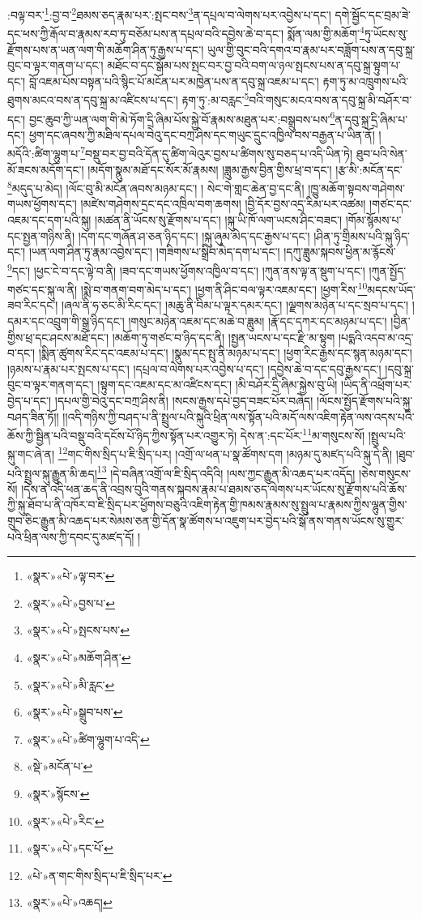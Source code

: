 :བལྟ་བར་\footnote{«སྣར་»«པེ་»ལྟ་བར་}:བྱ་བ་\footnote{«སྣར་»«པེ་»བྱས་པ་}ཐམས་ཅད་རྣམ་པར་:སྤང་བས་\footnote{«སྣར་»«པེ་»སྤངས་པས་}ན་དཔྲལ་བ་ལེགས་པར་འབྱེས་པ་དང་། དགེ་སྦྱོང་དང་བྲམ་ཟེ་དང་ཕས་ཀྱི་རྒོལ་བ་རྣམས་རབ་ཏུ་བཅོམ་པས་ན་དཔྲལ་བའི་དབྱེས་ཆེ་བ་དང་། སྨོན་ལམ་གྱི་མཆོག་\footnote{«སྣར་»«པེ་»མཆོག་ཤིན་}ཏུ་ཡོངས་སུ་རྫོགས་པས་ན་ཡན་ལག་གི་མཆོག་ཤིན་ཏུ་རྒྱས་པ་དང་། ཡུལ་གྱི་བུང་བའི་དགའ་བ་རྣམ་པར་བཟློག་པས་ན་དབུ་སྐྲ་བུང་བ་ལྟར་གནག་པ་དང་། མཐོང་བ་དང་སྒོམ་པས་སྤང་བར་བྱ་བའི་བག་ལ་ཉལ་སྤངས་པས་ན་དབུ་སྐྲ་སྟུག་པ་དང་། བློ་འཇམ་པོས་བསྟན་པའི་སྙིང་པོ་མངོན་པར་མཁྱེན་པས་ན་དབུ་སྐྲ་འཇམ་པ་དང་། རྟག་ཏུ་མ་འཁྲུགས་པའི་ཐུགས་མངའ་བས་ན་དབུ་སྐྲ་མ་འཛིངས་པ་དང་། རྟག་ཏུ་:མ་བརླང་\footnote{«སྣར་»«པེ་»མི་རླང་}བའི་གསུང་མངའ་བས་ན་དབུ་སྐྲ་མི་བཤོར་བ་དང་། བྱང་ཆུབ་ཀྱི་ཡན་ལག་གི་མེ་ཏོག་དྲི་ཞིམ་པོས་སྐྱེ་བོ་རྣམས་མཐུན་པར་:བསྒྲུབས་པས་\footnote{«སྣར་»«པེ་»སྒྲུབ་པས་}ན་དབུ་སྐྲ་དྲི་ཞིམ་པ་དང་། ཕྱག་དང་ཞབས་ཀྱི་མཐིལ་དཔལ་བེའུ་དང་བཀྲ་ཤིས་དང་གཡུང་དྲུང་འཁྱིལ་བས་བརྒྱན་པ་ཡིན་ནོ། །མདོའི་:ཚིག་ལྷུག་པ་\footnote{«སྣར་»«པེ་»ཚིག་ལྷུག་པ་འདི་}བསྡུ་བར་བྱ་བའི་དོན་དུ་ཚིག་ལེའུར་བྱས་པ་ཚིགས་སུ་བཅད་པ་འདི་ཡིན་ཏེ། ཐུབ་པའི་སེན་མོ་ཟངས་མདོག་དང་། །མདོག་སྣུམ་མཐོ་དང་སོར་མོ་རྣམས། །ཟླུམ་རྒྱས་བྱིན་གྱིས་ཕྲ་བ་དང་། །རྩ་མི་:མངོན་དང་\footnote{«སྡེ་»མངོན་པ་}མདུད་པ་མེད། །ལོང་བུ་མི་མངོན་ཞབས་མཉམ་དང་། །
སེང་གེ་གླང་ཆེན་བྱ་དང་ནི། །ཁྱུ་མཆོག་སྟབས་གཤེགས་གཡས་ཕྱོགས་དང་། །མཛེས་གཤེགས་དྲང་དང་འཁྲིལ་བག་ཆགས། །བྱི་དོར་བྱས་འདྲ་རིམ་པར་འཚམ། །གཙང་དང་འཇམ་དང་དག་པའི་སྐུ། །མཚན་ནི་ཡོངས་སུ་རྫོགས་པ་དང་། །སྐུ་ཡི་ཁོ་ལག་ཡངས་ཤིང་བཟང་། །གོམ་སྙོམས་པ་དང་སྤྱན་གཉིས་ནི། །དག་དང་གཞོན་ཤ་ཅན་ཉིད་དང་། །སྐུ་ཞུམ་མེད་དང་རྒྱས་པ་དང་། །ཤིན་ཏུ་གྲིམས་པའི་སྐུ་ཉིད་དང་། །ཡན་ལག་ཤིན་ཏུ་རྣམ་འབྱེས་དང་། །གཟིགས་པ་སྒྲིབ་མེད་དག་པ་དང་། །དཀུ་ཟླུམ་སྐབས་ཕྱིན་མ་རྙོངས་\footnote{«སྣར་»སྙོངས་}དང་། །ཕྱང་ངེ་བ་དང་ལྟེ་བ་ནི། །ཟབ་དང་གཡས་ཕྱོགས་འཁྱིལ་བ་དང་། །ཀུན་ནས་ལྟ་ན་སྡུག་པ་དང་། །ཀུན་སྤྱོད་གཙང་དང་སྐུ་ལ་ནི། །སྨེ་བ་གནག་བག་མེད་པ་དང་། །ཕྱག་ནི་ཤིང་བལ་ལྟར་འཇམ་དང་། །ཕྱག་རིས་\footnote{«སྣར་»«པེ་»རིང་}མདངས་ཡོད་ཟབ་རིང་དང་། །ཞལ་ནི་ཧ་ཅང་མི་རིང་དང་། །མཆུ་ནི་བིམ་པ་ལྟར་དམར་དང་། །ལྗགས་མཉེན་པ་དང་སྲབ་པ་དང་། །དམར་དང་འབྲུག་གི་སྒྲ་ཉིད་དང་། །གསུང་མཉེན་འཇམ་དང་མཆེ་བ་ཟླུམ། །རྣོ་དང་དཀར་དང་མཉམ་པ་དང་། །བྱིན་གྱིས་ཕྲ་དང་ཤངས་མཐོ་དང་། །མཆོག་ཏུ་གཙང་བ་ཉིད་དང་ནི། །སྤྱན་ཡངས་པ་དང་རྫི་མ་སྟུག །པདྨའི་འདབ་མ་འདྲ་བ་དང་། །སྨིན་ཚུགས་རིང་དང་འཇམ་པ་དང་། །སྣུམ་དང་སྤུ་ནི་མཉམ་པ་དང་། །ཕྱག་རིང་རྒྱས་དང་སྙན་མཉམ་དང་། །ཉམས་པ་རྣམ་པར་སྤངས་པ་དང་། །དཔྲལ་བ་ལེགས་པར་འབྱེས་པ་དང་། །དབྱེས་ཆེ་བ་དང་དབུ་རྒྱས་དང་། །དབུ་སྐྲ་བུང་བ་ལྟར་གནག་དང་། །སྟུག་དང་འཇམ་དང་མ་འཛིངས་དང་། །མི་བཤོར་དྲི་ཞིམ་སྐྱེས་བུ་ཡི། །ཡིད་ནི་འཕྲོག་པར་བྱེད་པ་དང་། །དཔལ་གྱི་བེའུ་དང་བཀྲ་ཤིས་ནི། །སངས་རྒྱས་དཔེ་བྱད་བཟང་པོར་བཞེད། །ལོངས་སྤྱོད་རྫོགས་པའི་སྐུ་བཤད་ཟིན་ཏོ།། །།འདི་གཉིས་ཀྱི་བཤད་པ་ནི་སྤྲུལ་པའི་སྐུའི་ཕྲིན་ལས་སྟོན་པའི་མདོ་ལས་འཇིག་རྟེན་ལས་འདས་པའི་ཆོས་ཀྱི་སྦྱིན་པའི་བསྡུ་བའི་དངོས་པོ་ཉིད་ཀྱིས་སྟོན་པར་འགྱུར་ཏེ། དེས་ན་:དང་པོར་\footnote{«སྣར་»«པེ་»དང་པོ་}མ་གསུངས་སོ། །སྤྲུལ་པའི་སྐུ་གང་ཞེ་ན། \footnote{«པེ་»ན་གང་གིས་སྲིད་པ་ཇི་སྲིད་པར་}གང་གིས་སྲིད་པ་ཇི་སྲིད་པར། །འགྲོ་ལ་ཕན་པ་སྣ་ཚོགས་དག །མཉམ་དུ་མཛད་པའི་སྐུ་དེ་ནི། །ཐུབ་པའི་སྤྲུལ་སྐུ་རྒྱུན་མི་ཆད།\footnote{«སྣར་»«པེ་»འཆད།} །དེ་བཞིན་འགྲོ་ལ་ཇི་སྲིད་འདིའི། །ལས་ཀྱང་རྒྱུན་མི་འཆད་པར་འདོད། །ཅེས་གསུངས་སོ། །དེས་ན་འདི་ཕན་ཆད་ནི་འབྲས་བུའི་གནས་སྐབས་རྣམ་པ་ཐམས་ཅད་ལེགས་པར་ཡོངས་སུ་རྫོགས་པའི་ཆོས་ཀྱི་སྐུ་ཐོབ་པ་ནི་འཁོར་བ་ཇི་སྲིད་པར་ཕྱོགས་བཅུའི་འཇིག་རྟེན་གྱི་ཁམས་རྣམས་སུ་སྤྲུལ་པ་རྣམས་ཀྱིས་ལྷུན་གྱིས་གྲུབ་ཅིང་རྒྱུན་མི་འཆད་པར་སེམས་ཅན་གྱི་དོན་སྣ་ཚོགས་པ་འཇུག་པར་བྱེད་པའི་སྒོ་ནས་གནས་ཡོངས་སུ་གྱུར་པའི་ཕྲིན་ལས་ཀྱི་དབང་དུ་མཛད་དོ། །
